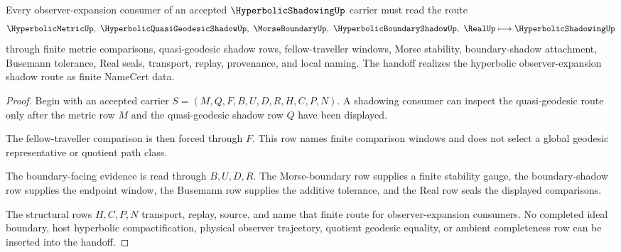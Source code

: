 \begin{theorem}
\label{thm:hyperbolic-shadowing-fellow-traveller-handoff}
Every observer-expansion consumer of an accepted $\HyperbolicShadowingUp$ carrier must read the route
$$
\HyperbolicMetricUp,\ \HyperbolicQuasiGeodesicShadowUp,\ \MorseBoundaryUp,\ \HyperbolicBoundaryShadowUp,\ \RealUp
\longmapsto
\HyperbolicShadowingUp
$$
through finite metric comparisons, quasi-geodesic shadow rows, fellow-traveller windows, Morse stability, boundary-shadow attachment, Busemann tolerance, Real seals, transport, replay, provenance, and local naming. The handoff realizes the hyperbolic observer-expansion shadow route as finite NameCert data.
\end{theorem}
\begin{proof}
Begin with an accepted carrier $S=(M,Q,F,B,U,D,R,H,C,P,N)$. A shadowing consumer can inspect the quasi-geodesic route only after the metric row $M$ and the quasi-geodesic shadow row $Q$ have been displayed.

The fellow-traveller comparison is then forced through $F$. This row names finite comparison windows and does not select a global geodesic representative or quotient path class.

The boundary-facing evidence is read through $B,U,D,R$. The Morse-boundary row supplies a finite stability gauge, the boundary-shadow row supplies the endpoint window, the Busemann row supplies the additive tolerance, and the Real row seals the displayed comparisons.

The structural rows $H,C,P,N$ transport, replay, source, and name that finite route for observer-expansion consumers. No completed ideal boundary, host hyperbolic compactification, physical observer trajectory, quotient geodesic equality, or ambient completeness row can be inserted into the handoff.
\end{proof}



